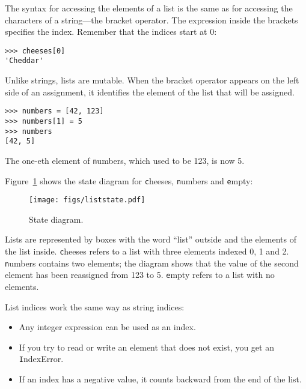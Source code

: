 \documentclass[
DIV=11,
fontsize=13,
twoside,
headinclude=false,
titlepage=firstiscover,
abstract=true,
headsepline=true,
footsepline=true,
chapterprefix=true, %
headings=big,
bibliography=totoc,%
captions=tableheading
]{scrbook}
\theoremstyle{definition}
\begin{document}
The syntax for accessing the elements of a list is the same as for
accessing the characters of a string---the bracket operator.  The
expression inside the brackets specifies the index.  Remember that the
indices start at 0:

\begin{lstlisting}
>>> cheeses[0]
'Cheddar'
\end{lstlisting}
%
Unlike strings, lists are mutable.  When the bracket operator appears
on the left side of an assignment, it identifies the element of the
list that will be assigned.

\begin{lstlisting}
>>> numbers = [42, 123]
>>> numbers[1] = 5
>>> numbers
[42, 5]
\end{lstlisting}
%
The one-eth element of {\texttt numbers}, which
used to be 123, is now 5.

Figure~\ref{fig.liststate} shows 
the state diagram for {\texttt
cheeses}, {\texttt numbers} and {\texttt empty}:

\begin{figure}
\centerline
{\texttt{[image: figs/liststate.pdf]}}
\caption{State diagram.}
\label{fig.liststate}
\end{figure}

Lists are represented by boxes with the word ``list'' outside
and the elements of the list inside.  {\texttt cheeses} refers to
a list with three elements indexed 0, 1 and 2.
{\texttt numbers} contains two elements; the diagram shows that the
value of the second element has been reassigned from 123 to 5.
{\texttt empty} refers to a list with no elements.

List indices work the same way as string indices:

\begin{itemize}

\item Any integer expression can be used as an index.

\item If you try to read or write an element that does not exist, you
get an {\texttt IndexError}.

\item If an index has a negative value, it counts backward from the
end of the list.

\end{itemize}
\end{document}
